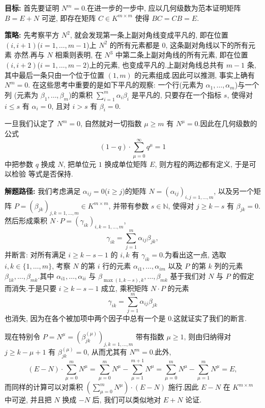 \noindent\textbf{目标:} 首先要证明 $N^m = 0$.在进一步的一步中, 应以几何级数为范本证明矩阵
$B = E + N$ 可逆, 即存在矩阵 $C \in K^{m \times m}$ 使得 $BC = CB = E$.

\noindent\textbf{策略:} 先考察平方 $N^2$, 就会发现第一条上副对角线变成平凡的, 即在位置
$(i, i+1)$($i = 1, \ldots, m-1$)上 $N^2$ 的所有元素都是 $0$, 这条副对角线以下的所有元素
亦然.再与 $N$ 相乘则表明, 在 $N^3$ 中第二条上副对角线的所有元素, 即在位置
$(i, i+2)$($i = 1, \ldots, m-2$)上的元素, 也变成平凡的.上副对角线总共有 $m - 1$ 条,
其中最后一条只由一个位于位置 $(1, m)$ 的元素组成.因此可以推测, 事实上确有 $N^m = 0$.
在这些思考中重要的是如下平凡的观察: 一个行(元素为 $\alpha_1, \ldots, \alpha_m$)与一个列
(元素为 $\beta_1, \ldots, \beta_m$)的乘积 $\sum_{i = 1}^{m} \alpha_i \beta_i$ 是平凡的,
只要存在一个指标 $s$, 使得对 $i \leq s$ 有 $\alpha_i = 0$, 且对 $i > s$ 有
$\beta_i = 0$.

一旦我们认定了 $N^m = 0$, 自然就对一切指数 $\mu \geq m$ 有 $N^{\mu} = 0$.因此在几何级数的
公式
\[
(1 - q) \cdot \sum_{\mu = 0}^{\infty} q^{\mu} = 1
\]
中把参数 $q$ 换成 $N$, 把单位元 $1$ 换成单位矩阵 $E$, 则方程的两边都有定义, 于是可以检验
等式是否保持.

\noindent\textbf{解题路径:} 我们考虑满足 $\alpha_{ij} = 0$($i \geq j$)的矩阵
$N = (\alpha_{ij})_{i, j = 1, \ldots, m}$, 以及另一个矩阵
$P = (\beta_{jk})_{j, k = 1, \ldots, m} \in K^{m \times m}$, 并带有参数 $s \in \mathbb{N}$,
使得对 $j \geq k - s$ 有 $\beta_{jk} = 0$.然后形成乘积 $N \cdot P = (\gamma_{ik})_{i, k = 1, \ldots, m}$,
\[
\gamma_{ik} = \sum_{j = 1}^{m} \alpha_{ij} \beta_{jk},
\]
并断言: 对所有满足 $i \geq k - s - 1$ 的 $i, k$ 有 $\gamma_{ik} = 0$.为看出这一点,
选取 $i, k \in \{1, \ldots, m\}$, 考察 $N$ 的第 $i$ 行的元素 $\alpha_{i1}, \ldots, \alpha_{im}$
以及 $P$ 的第 $k$ 列的元素 $\beta_{1k}, \ldots, \beta_{mk}$.其中 $\alpha_{i1}, \ldots, \alpha_{ii}$
与 $\beta_{\max(1, k-s), k}, \ldots, \beta_{mk}$ 基于我们对 $N$ 与 $P$ 的假定而消失.于是只要
$i \geq k - s - 1$ 成立, 乘积矩阵 $N \cdot P$ 的元素
\[
\gamma_{ik} = \sum_{j = 1}^{m} \alpha_{ij} \beta_{jk}
\]
也消失, 因为在各个被加项中两个因子中总有一个是 $0$.这就证实了我们的断言.

现在特别令 $P = N^{\mu} = (\beta_{jk}^{(\mu)})_{j, k = 1, \ldots, m}$ 带有指数 $\mu \geq 1$,
则由归纳得对 $j \ge k - \mu + 1$ 有 $\beta_{jk}^{(\mu)} = 0$, 从而尤其有 $N^m = 0$.此外,
\[
(E - N) \cdot \sum_{\mu = 0}^{m} N^{\mu} = \sum_{\mu = 0}^{m} N^{\mu} - \sum_{\mu = 1}^{m + 1} N^{\mu} = \sum_{\mu = 0}^{m} N^{\mu} - \sum_{\mu = 1}^{m} N^{\mu} = E,
\]
而同样的计算可以对乘积 $(\sum_{\mu = 0}^{m} N^{\mu}) \cdot (E - N)$ 施行.因此 $E - N$
在 $K^{m \times m}$ 中可逆, 并且把 $N$ 换成 $-N$ 后, 我们可以类似地对 $E + N$ 论证.

